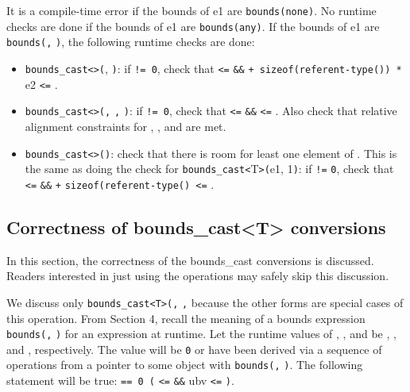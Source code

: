 It is a compile-time error if the bounds of e1 are
\texttt{bounds(none)}. No runtime checks are done if the bounds of e1
are \texttt{bounds(any)}. If the bounds of e1 are
\texttt{bounds(}\texttt{,} \texttt{)}, the following
runtime checks are done:

\begin{itemize}
\item
  \texttt{bounds\_cast\textless{}}\texttt{\textgreater{}(},
  \texttt{)}: if  \texttt{!= 0}, check that 
  \texttt{\textless{}=}  \texttt{\&\&}  \texttt{+
  sizeof(referent-type(}\texttt{)) *} e2 \texttt{\textless{}=}
  .
\item
  \texttt{bounds\_cast\textless{}}\texttt{\textgreater{}(}\texttt{,}
  \texttt{,} \texttt{)}: if  \texttt{!= 0},
  check that  \texttt{\textless{}=}  \texttt{\&\&}
   \texttt{\textless{}=} . Also check that relative
  alignment constraints for , , and  are met.
\item
  \texttt{bounds\_cast\textless{}}\texttt{\textgreater{}(}\texttt{)}:
  check that there is room for least one element of . This is
  the same as doing the check for
  \texttt{bounds\_cast\textless{}}T\texttt{\textgreater{}(}e1,
  1\texttt{)}: if  \texttt{!=} \texttt{0}, check that 
  \texttt{\textless{}=}  \texttt{\&\&}  \texttt{+}
  \texttt{sizeof(referent-type(}\texttt{) \textless{}=}
  .
\end{itemize}

\subsection{Correctness of bounds\_cast\textless{}T\textgreater{} conversions}
\label{correctness-of-boundsux5fcastt-conversions}

In this section, the correctness of the bounds\_cast conversions is
discussed. Readers interested in just using the operations may safely
skip this discussion.

We discuss only
\texttt{bounds\_cast\textless{}T\textgreater{}(}\texttt{,}
\texttt{,}  because the other forms are special cases
of this operation. From Section 4, recall the meaning of a bounds
expression \texttt{bounds(}\texttt{,} \texttt{)} for
an expression  at runtime. Let the runtime values of ,
, and  be , , and ,
respectively. The value  will be \texttt{0} or have been
derived via a sequence of operations from a pointer to some object
 with \texttt{bounds(}\texttt{,}
\texttt{)}. The following statement will be true: 
\texttt{== 0 \textbar{}\textbar{} (} \texttt{\textless{}=}
 \texttt{\&\&} ubv \texttt{\textless{}=}
\texttt{)}.

